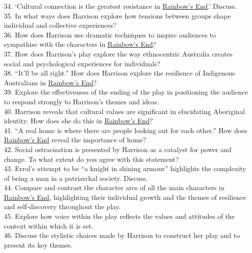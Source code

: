 \documentclass[a4paper]{article}
\begin{document}
34. ‘Cultural connection is the greatest resistance in \underline{Rainbow’s End}.’ Discuss.\\

35. In what ways does Harrison explore how tensions between groups shape individual and collective experiences?\\

36. How does Harrison use dramatic techniques to inspire audiences to sympathise with the characters in \underline{Rainbow’s End}?\\

37. How does Harrison’s play explore the way ethnocentric Australia creates social and psychological experiences for individuals?\\

38. “It’ll be all right.” How does Harrison explore the resilience of Indigenous Australians in \underline{Rainbow’s End}?\\

39. Explore the effectiveness of the ending of the play in positioning the audience to respond strongly to Harrison’s themes and ideas.\\

40. Harrison reveals that cultural values are significant in elucidating Aboriginal identity. How does she do this in \underline{Rainbow’s End}?\\

41. “A real home is where there are people looking out for each other.” How does \underline{Rainbow’s End} reveal the importance of home?\\

42. Social ostracisation is presented by Harrison as a catalyst for power and change. To what extent do you agree with this statement?\\

43. Errol’s attempt to be “a knight in shining armour” highlights the complexity of being a man in a patriarchal society. Discuss.\\

44. Compare and contrast the character arcs of all the main characters in \underline{Rainbow’s End}, highlighting their individual growth and the themes of resilience and self-discovery throughout the play.\\

45. Explore how voice within the play reflects the values and attitudes of the context within which it is set.\\

46. Discuss the stylistic choices made by Harrison to construct her play and to present its key themes.\\
\end{document}

